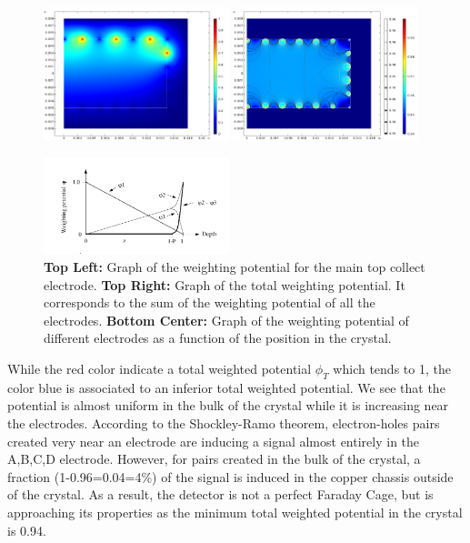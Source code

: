 \begin{figure}
\centering
\includegraphics[width=0.48\textwidth]{Figures/Electrodes/weighted_potential_collect.png}
\includegraphics[width=0.48\textwidth]{Figures/Electrodes/weighted_potential_total.png}

\includegraphics[width=0.48\textwidth]{Figures/Electrodes/ramo_potential.png}
\caption{
\textbf{Top Left:} Graph of the weighting potential for the main top collect electrode.
\textbf{Top Right:} Graph of the total weighting potential. It corresponds to the sum of the weighting potential of all the electrodes.
\textbf{Bottom Center:} Graph of the weighting potential of different electrodes as a function of the position in the crystal.
}
\label{fig:weighting-potential}
\end{figure}

While the red color indicate a total weighted potential $\phi_T$ which tends to 1, the color blue is associated to an inferior total weighted potential. We see that the potential is almost uniform in the bulk of the crystal while it is increasing near the electrodes. According to the Shockley-Ramo theorem, electron-holes pairs created very near an electrode are inducing a signal almost entirely in the A,B,C,D electrode. However, for pairs created in the bulk of the crystal, a fraction (1-0.96=0.04=4\%) of the signal is induced in the copper chassis outside of the crystal. As a result, the detector is not a perfect Faraday Cage, but is approaching its properties as the minimum total weighted potential in the crystal is 0.94.  

